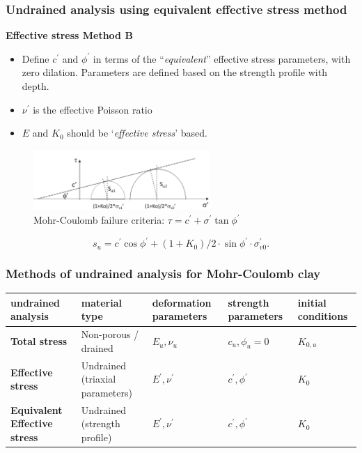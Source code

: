 \documentclass[notes]{beamer}
\begin{document}
\begin{frame}
\frametitle{Undrained analysis using equivalent effective stress method}
\textbf{Effective stress Method B}
\begin{itemize}
	\item Define $c^\prime$ and $\phi^\prime$ in terms of the ``\textit{equivalent}'' effective stress parameters, with zero dilation. Parameters are defined based on the strength profile with depth.
	\item $\nu^\prime$ is the effective Poisson ratio
	\item $E$ and $K_0$ should be `\textit{effective stress}' based.
\end{itemize}
\begin{figure}
	\includegraphics[width=0.6\textwidth]{figs/su-total.png}
	\caption*{Mohr-Coulomb failure criteria: $\tau = c^\prime + \sigma^\prime \tan \phi^\prime$}
\end{figure}
\begin{equation*}
s_u = c^\prime \cos \phi^\prime + (1+K_0)/2 \cdot \sin \phi^\prime \cdot \sigma_{v0}^\prime.
\end{equation*}
\end{frame}

\begin{frame}
\frametitle{Methods of undrained analysis for Mohr-Coulomb clay}
\begin{table}
	\begin{tabularx}{\textwidth}{XXXXX}
		\toprule
		\textbf{undrained analysis}          & \textbf{material type} & \textbf{deformation parameters} & \textbf{strength parameters} & \textbf{initial conditions} \\
		\midrule
		\textbf{Total stress}                           & Non-porous / drained   & $E_u, \nu_u$                    & $c_u, \phi_u = 0$            & $K_{0,u}$                   \\
		\midrule 
		\textbf{Effective stress} & Undrained (triaxial parameters)             & $E^\prime, \nu^\prime$          & $c^\prime, \phi^\prime$      & $K_0$                       \\
		\midrule
		\textbf{Equivalent Effective stress}    & Undrained (strength profile)           & $E^\prime, \nu^\prime$          & $c^\prime, \phi^\prime$      & $K_0$ \\    
		\bottomrule                 
	\end{tabularx}
\end{table}
\end{frame}
\end{document}

